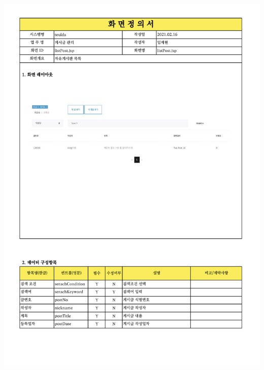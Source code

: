 {{{{{{{{{{{{{{{{{{{{{{{{{{{{{{{{{{{{{{{{{{{{{{{{{{{{{{{\includegraphics[width=20cm]{./Figure/Design/Display/post/post_03.pdf} \\
}}}}}}}}}}}}}}}}}}}}}}}}}}}}}}}}}}}}}}}}}}}}}}}}}}}}}}}
